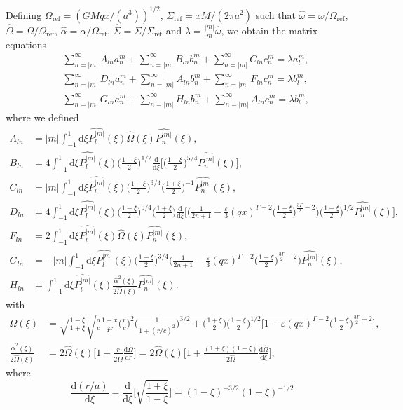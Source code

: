 \documentclass[11pt]{article}
\newcommand{\rd}{\mathrm{d}}
\newcommand{\anm}{a_n^m}
\newcommand{\bnm}{b_n^m}
\newcommand{\cnm}{c_n^m}
\newcommand{\alm}{a_l^m}
\newcommand{\blm}{b_l^m}
\newcommand{\Pnm}{P_n^{|m|}}
\newcommand{\Plm}{P_l^{|m|}}
\newcommand{\hPnm}{\widehat{\Pnm}}
\newcommand{\hPlm}{\widehat{\Plm}}
\newcommand{\homega}{\widehat{\omega}}
\newcommand{\hOmega}{\widehat{\Omega}}
\newcommand{\Omegaref}{\Omega_{\mathrm{ref}}}
\newcommand{\halpha}{\widehat{\alpha}}
\newcommand{\Sigmaref}{\Sigma_{\mathrm{ref}}}
\newcommand{\hSigma}{\widehat{\Sigma}}
\begin{document}
Defining $\Omegaref=(GMqx/(a^3 ))^{1/2}$, $\Sigmaref=xM/(2\pi a^2)$   such that $\homega = \omega/\Omegaref$, $\hOmega = \Omega/\Omegaref$, $\halpha = \alpha/\Omegaref$, $\hSigma=\Sigma/\Sigmaref$ and $\lambda=\frac{|m|}{m}\homega$, we obtain the matrix equations
\begin{align*}
&\sum_{n=|m|}^{\infty}  A_{ln} \anm  +\sum_{n=|m|}^{\infty}  B_{ln}\bnm+\sum_{n=|m|}^{\infty}  C_{ln}\cnm= \lambda \alm ,\\
&\sum_{n=|m|}^{\infty}D_{ln}\anm + \sum_{n=|m|}^{\infty}   A_{ln} \bnm+  \sum_{n=|m|}^{\infty} F_{ln} \cnm  = \lambda   \blm ,\\
&\sum_{n=|m|}^{\infty}G_{ln}\anm + \sum_{n=|m|}^{\infty}   H_{ln} \bnm+  \sum_{n=|m|}^{\infty} A_{ln} \cnm  = \lambda   \blm ,
 \end{align*}
where we defined
\begin{align*}
A_{ln} &= |m| \int_{-1}^{1} \rd \xi  \hPlm(\xi)\hOmega(\xi)\hPnm(\xi) , \\
B_{ln} &= 4 \int_{-1}^{1} \rd \xi  \hPlm(\xi) \bigg(\frac{1-\xi}{2}\bigg)^{1/2} \frac{\rd}{\rd \xi} \bigg[\bigg(\frac{1-\xi}{2}\bigg)^{5/4}\hPnm(\xi)\bigg], \\
C_{ln} &= |m| \int_{-1}^{1} \rd \xi \hPlm(\xi) \bigg(\frac{1-\xi}{2}\bigg)^{3/4}\bigg(\frac{1+\xi}{2}\bigg)^{-1}   \hPnm(\xi), \\
D_{ln} &= 4 \int_{-1}^{1} \rd \xi \hPlm(\xi)  \bigg(\frac{1-\xi}{2}\bigg)^{5/4} \bigg(\frac{1+\xi}{2}\bigg) 
\frac{\rd}{\rd \xi} \bigg[\bigg(\frac{1}{2n+1}-\frac{\varepsilon}{3}  (qx)^{\Gamma-2} \bigg(\frac{1-\xi}{2}\bigg)^{\frac{3\Gamma}{2}-2}\bigg) \bigg(\frac{1-\xi}{2}\bigg)^{1/2}\hPnm(\xi) \bigg] ,\\
F_{ln} &=2 \int_{-1}^{1} \rd \xi  \hPlm(\xi)\hOmega(\xi)\hPnm(\xi) , \\
G_{ln} &= -|m| \int_{-1}^{1} \rd \xi \hPlm(\xi)  \bigg(\frac{1-\xi}{2}\bigg)^{3/4} 
\bigg(\frac{1}{2n+1}-\frac{\varepsilon}{3}  (qx)^{\Gamma-2} \bigg(\frac{1-\xi}{2}\bigg)^{\frac{3\Gamma}{2}-2}\bigg) \hPnm(\xi)  ,\\
H_{ln} &=  \int_{-1}^{1} \rd \xi  \hPlm(\xi)\frac{\halpha^2(\xi)}{2\hOmega(\xi)}\hPnm(\xi) .
\end{align*}
with
\begin{align*}
\hOmega(\xi) &=\sqrt{\frac{1-\xi}{1+\xi}} \sqrt{\frac{a}{c}\frac{1-x}{qx}\bigg( \frac{r}{c}\bigg)^2 \bigg(\frac{1}{1+(r/c)^2}\bigg)^{3/2} 
+ \bigg(\frac{1+\xi}{2}\bigg) \bigg(\frac{1-\xi}{2}\bigg)^{1/2}  \bigg[1- \varepsilon(qx)^{\Gamma-2}\bigg(\frac{1-\xi}{2}\bigg)^{\frac{3\Gamma}{2}-2} \bigg] } ,\\
\frac{\halpha^2(\xi)}{2\hOmega(\xi)} &= 2\hOmega(\xi) \bigg[1+\frac{r}{2\hOmega}\frac{\rd \hOmega }{\rd r}\bigg] = 2\hOmega(\xi) \bigg[1+\frac{(1+\xi)(1-\xi)}{2\hOmega}\frac{\rd \hOmega }{\rd \xi} \bigg],
\end{align*}
where
$$\frac{\rd(r/a)}{\rd \xi} = \frac{\rd}{\rd \xi} \bigg[\sqrt{\frac{1+\xi}{1-\xi}}\bigg] = (1-\xi)^{-3/2}(1+\xi)^{-1/2}$$
\end{document}
